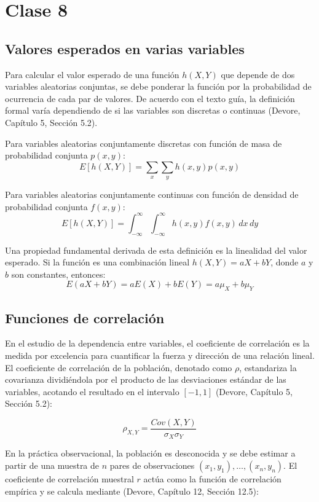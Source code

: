 \chapter{Clase 8}

\section{Valores esperados en varias variables}

Para calcular el valor esperado de una función $h(X,Y)$ que depende de dos variables aleatorias conjuntas, se debe ponderar la función por la probabilidad de ocurrencia de cada par de valores. De acuerdo con el texto guía, la definición formal varía dependiendo de si las variables son discretas o continuas (Devore, Capítulo 5, Sección 5.2).

Para variables aleatorias conjuntamente discretas con función de masa de probabilidad conjunta $p(x,y)$:
$$ E[h(X,Y)] = \sum_{x} \sum_{y} h(x,y) p(x,y) $$

Para variables aleatorias conjuntamente continuas con función de densidad de probabilidad conjunta $f(x,y)$:
$$ E[h(X,Y)] = \int_{-\infty}^{\infty} \int_{-\infty}^{\infty} h(x,y) f(x,y) \, dx \, dy $$

Una propiedad fundamental derivada de esta definición es la linealidad del valor esperado. Si la función es una combinación lineal $h(X,Y) = aX + bY$, donde $a$ y $b$ son constantes, entonces:
$$ E(aX + bY) = aE(X) + bE(Y) = a\mu_X + b\mu_Y $$

\section{Funciones de correlación}

En el estudio de la dependencia entre variables, el coeficiente de correlación es la medida por excelencia para cuantificar la fuerza y dirección de una relación lineal. El coeficiente de correlación de la población, denotado como $\rho$, estandariza la covarianza dividiéndola por el producto de las desviaciones estándar de las variables, acotando el resultado en el intervalo $[-1, 1]$ (Devore, Capítulo 5, Sección 5.2):

$$ \rho_{X,Y} = \frac{Cov(X,Y)}{\sigma_X \sigma_Y} $$

En la práctica observacional, la población es desconocida y se debe estimar a partir de una muestra de $n$ pares de observaciones $(x_1, y_1), \dots, (x_n, y_n)$. El coeficiente de correlación muestral $r$ actúa como la función de correlación empírica y se calcula mediante (Devore, Capítulo 12, Sección 12.5):


